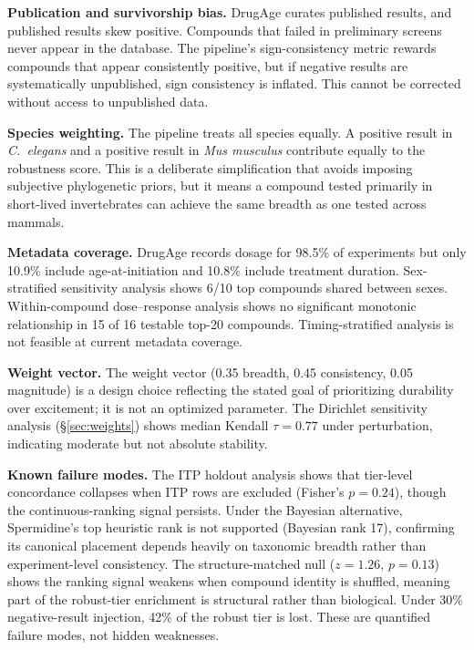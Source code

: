\documentclass[11pt]{article}
\begin{document}
\textbf{Publication and survivorship bias.} DrugAge curates published results, and published results skew positive. Compounds that failed in preliminary screens never appear in the database. The pipeline's sign-consistency metric rewards compounds that appear consistently positive, but if negative results are systematically unpublished, sign consistency is inflated. This cannot be corrected without access to unpublished data.

\textbf{Species weighting.} The pipeline treats all species equally. A positive result in \emph{C.~elegans} and a positive result in \emph{Mus musculus} contribute equally to the robustness score. This is a deliberate simplification that avoids imposing subjective phylogenetic priors, but it means a compound tested primarily in short-lived invertebrates can achieve the same breadth as one tested across mammals.

\textbf{Metadata coverage.} DrugAge records dosage for 98.5\% of experiments but only 10.9\% include age-at-initiation and 10.8\% include treatment duration. Sex-stratified sensitivity analysis shows 6/10 top compounds shared between sexes. Within-compound dose--response analysis shows no significant monotonic relationship in 15 of 16 testable top-20 compounds. Timing-stratified analysis is not feasible at current metadata coverage.

\textbf{Weight vector.} The weight vector (0.35 breadth, 0.45 consistency, 0.05 magnitude) is a design choice reflecting the stated goal of prioritizing durability over excitement; it is not an optimized parameter. The Dirichlet sensitivity analysis (\S\ref{sec:weights}) shows median Kendall $\tau = 0.77$ under perturbation, indicating moderate but not absolute stability.

\textbf{Known failure modes.} The ITP holdout analysis shows that tier-level concordance collapses when ITP rows are excluded (Fisher's $p = 0.24$), though the continuous-ranking signal persists. Under the Bayesian alternative, Spermidine's top heuristic rank is not supported (Bayesian rank 17), confirming its canonical placement depends heavily on taxonomic breadth rather than experiment-level consistency. The structure-matched null ($z = 1.26$, $p = 0.13$) shows the ranking signal weakens when compound identity is shuffled, meaning part of the robust-tier enrichment is structural rather than biological. Under 30\% negative-result injection, 42\% of the robust tier is lost. These are quantified failure modes, not hidden weaknesses.
\end{document}
